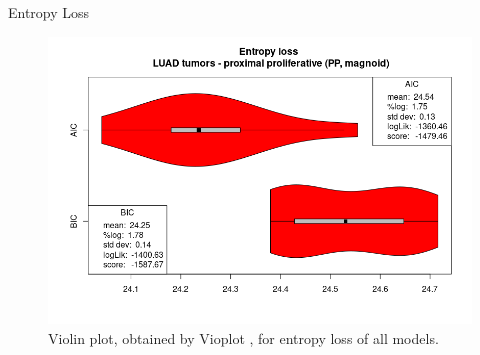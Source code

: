 \documentclass{beamer}
\begin{document}
\begin{frame}{Entropy Loss}
\begin{figure}
        \includegraphics[scale = 0.215]{img/vioplot_PP.png}
        \caption{Violin plot, obtained by Vioplot \cite{vioplot}, for entropy loss of all models.}
    \end{figure}
\end{frame}
\end{document}

